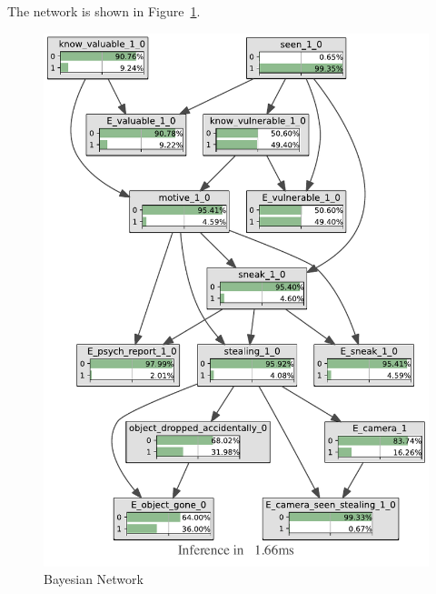 The network is shown in Figure~\ref{gmNetwork}.
\begin{figure}[htbp]
\begin{center}
\includegraphics[width=.7\linewidth]{../experiments/GroteMarkt/bnImage/BNIMAGEGroteMarkt.pdf}
\end{center}
\caption{Bayesian Network}
\label{gmNetwork}
\end{figure}


